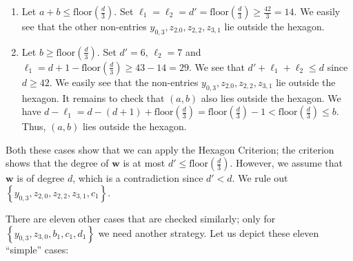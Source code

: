 \begin{enumerate}
    \item Let \( a + b \leq \mathrm{floor}(\frac{d}{3})\). Set \( \ell_1 = \ell_2 = d' =  \mathrm{floor}(\frac{d}{3}) \geq \frac{42}{3} = 14 \). We easily see that the other non-entries \( y_{0,3}, z_{2.0}, z_{2,2}, z_{3,1} \) lie outside the hexagon.
    \item Let \( b \geq \mathrm{floor}(\frac{d}{3})  \). Set \( d' = 6 \), \( \ell_2 = 7 \) and \( \ell_1 = d + 1 - \mathrm{floor}(\frac{d}{3}) \geq 43 - 14 = 29 \). We see that \( d' + \ell_1 + \ell_2 \leq d \) since \( d \geq 42 \). We easily see that the non-entries \( y_{0,3}, z_{2.0}, z_{2,2}, z_{3,1} \) lie outside the hexagon. It remains to check that \( (a,b) \) also lies outside the hexagon. We have \( d - \ell_1 = d - (d + 1) + \mathrm{floor}(\frac{d}{3}) =\mathrm{floor}(\frac{d}{3}) - 1 < \mathrm{floor}(\frac{d}{3}) \leq b \). Thus, \( (a,b) \) lies outside the hexagon.
\end{enumerate}
Both these cases show that we can apply the Hexagon Criterion; the criterion shows that the degree of \( \mathbf{w} \) is at most \( d' \leq \mathrm{floor}(\frac{d}{3}) \). However, we assume that \( \mathbf{w} \) is of degree \( d \), which is a contradiction since \( d' < d \). We rule out \( \left\{ y_{0,3}, z_{2,0}, z_{2,2}, z_{3,1}, c_1 \right\} \).

There are eleven other cases that are checked similarly; only for \(  \left\{ y_{0,3}, z_{3,0}, b_1, c_1, d_1 \right\}\) we need another strategy. Let us depict these eleven ``simple'' cases:


